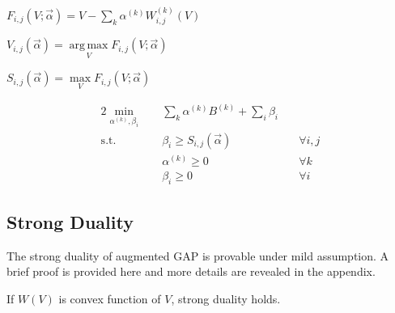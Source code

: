 \documentclass[sigconf]{acmart}
\DeclareMathOperator*{\argmax}{arg\,max}
\newcommand{\sumi}{\sum\limits_i}
\newcommand{\sumk}{\sum\limits_k}
\newcommand{\sV}{V_{i,j}}
\newcommand{\sW}{W_{i,j}^{(k)}}
\newcommand{\sB}{B^{(k)}}
\newcommand{\salpha}{\alpha^{(k)}}
\newcommand{\sbeta}{\beta_i}
\newcommand{\sF}{F_{i,j}}
\newcommand{\sS}{S_{i,j}}
\newcommand{\valpha}{\vec{\alpha}}
\newcommand{\scoreconstraint}{\sbeta \ge \sS(\vec{\alpha})}
\begin{document}
\begin{definition}
$\sF(V; \valpha) = V - \sumk \salpha \sW(V)$
\end{definition}

\begin{definition}
$\sV(\valpha) = \argmax\limits_V \sF(V; \valpha)$
\end{definition}

\begin{definition}
$\sS(\valpha) = \max\limits_V \sF(V; \valpha)$
\end{definition}

\begin{alignat}{2}
    \min\limits_{\salpha, \sbeta} \quad & \sumk \salpha \sB + \sumi \sbeta \quad   & {} \\
    \mbox{s.t.} \quad                   & \scoreconstraint \quad                   & \forall i,j \\
    \quad                               & \salpha \ge 0 \quad                      & \forall k \\
    \quad                               & \sbeta \ge 0 \quad                       & \forall i
\end{alignat}

\subsection{Strong Duality}

The strong duality of augmented GAP is provable under mild assumption.
A brief proof is provided here and more details are revealed in the appendix.

\begin{theorem}
If $W(V)$ is convex function of $V$, strong duality holds.
\end{theorem}
\end{document}
